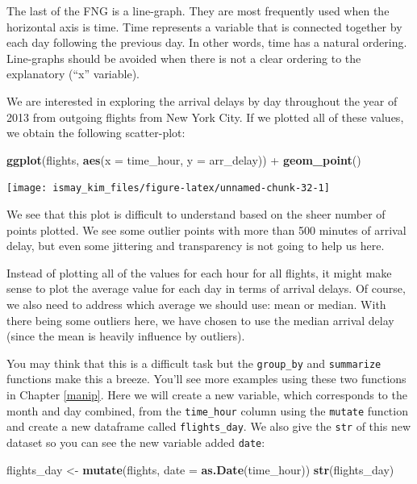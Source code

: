 \documentclass[]{tufte-book}
\newenvironment{Shaded}{\begin{snugshade}}{\end{snugshade}}
\newcommand{\KeywordTok}[1]{\textcolor[rgb]{0.13,0.29,0.53}{\textbf{{#1}}}}
\newcommand{\DataTypeTok}[1]{\textcolor[rgb]{0.13,0.29,0.53}{{#1}}}
\newcommand{\StringTok}[1]{\textcolor[rgb]{0.31,0.60,0.02}{{#1}}}
\newcommand{\NormalTok}[1]{{#1}}
\begin{document}
The last of the FNG is a line-graph. They are most frequently used when
the horizontal axis is time. Time represents a variable that is
connected together by each day following the previous day. In other
words, time has a natural ordering. Line-graphs should be avoided when
there is not a clear ordering to the explanatory (``x'' variable).

We are interested in exploring the arrival delays by day throughout the
year of 2013 from outgoing flights from New York City. If we plotted all
of these values, we obtain the following scatter-plot:

\begin{Shaded}
\begin{Highlighting}[]
\KeywordTok{ggplot}\NormalTok{(flights, }\KeywordTok{aes}\NormalTok{(}\DataTypeTok{x =} \NormalTok{time_hour, }\DataTypeTok{y =} \NormalTok{arr_delay)) +}\StringTok{ }
\StringTok{  }\KeywordTok{geom_point}\NormalTok{()}
\end{Highlighting}
\end{Shaded}

\texttt{[image: ismay\_kim\_files/figure-latex/unnamed-chunk-32-1]}

We see that this plot is difficult to understand based on the sheer
number of points plotted. We see some outlier points with more than 500
minutes of arrival delay, but even some jittering and transparency is
not going to help us here.

Instead of plotting all of the values for each hour for all flights, it
might make sense to plot the average value for each day in terms of
arrival delays. Of course, we also need to address which average we
should use: mean or median. With there being some outliers here, we have
chosen to use the median arrival delay (since the mean is heavily
influence by outliers).

You may think that this is a difficult task but the \texttt{group\_by}
and \texttt{summarize} functions make this a breeze. You'll see more
examples using these two functions in Chapter \ref{manip}. Here we will
create a new variable, which corresponds to the month and day combined,
from the \texttt{time\_hour} column using the \texttt{mutate} function
and create a new dataframe called \texttt{flights\_day}. We also give
the \texttt{str} of this new dataset so you can see the new variable
added \texttt{date}:

\begin{Shaded}
\begin{Highlighting}[]
\NormalTok{flights_day <-}\StringTok{ }\KeywordTok{mutate}\NormalTok{(flights, }\DataTypeTok{date =} \KeywordTok{as.Date}\NormalTok{(time_hour))}
\KeywordTok{str}\NormalTok{(flights_day)}
\end{Highlighting}
\end{Shaded}
\end{document}
